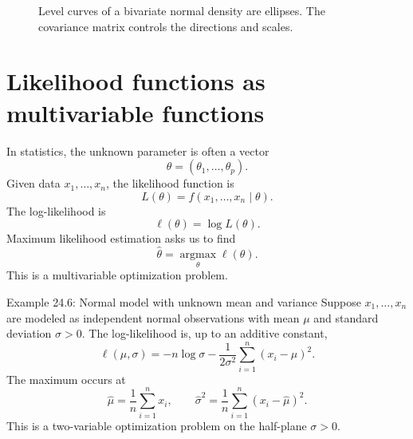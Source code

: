 \documentclass[11pt,oneside]{book}
\begin{document}
\begin{figure}[H]
\centering
{}
\caption{Level curves of a bivariate normal density are ellipses. The covariance matrix controls the directions and scales.}
\end{figure}

\section{Likelihood functions as multivariable functions}

In statistics, the unknown parameter is often a vector
\[
\theta=(\theta_1,\ldots,\theta_p).
\]
Given data $x_1,\ldots,x_n$, the likelihood function is
\[
L(\theta)=f(x_1,\ldots,x_n\mid\theta).
\]
The log-likelihood is
\[
\ell(\theta)=\log L(\theta).
\]
Maximum likelihood estimation asks us to find
\[
\hat\theta=\operatorname*{argmax}_{\theta}\ell(\theta).
\]
This is a multivariable optimization problem.

\begin{examplebox}{Example 24.6: Normal model with unknown mean and variance}
Suppose $x_1,\ldots,x_n$ are modeled as independent normal observations with mean $\mu$ and standard deviation $\sigma>0$. The log-likelihood is, up to an additive constant,
\[
\ell(\mu,\sigma)=-n\log\sigma-\frac{1}{2\sigma^2}\sum_{i=1}^n(x_i-\mu)^2.
\]
The maximum occurs at
\[
\hat\mu=\frac1n\sum_{i=1}^n x_i,
\qquad
\hat\sigma^2=\frac1n\sum_{i=1}^n(x_i-\hat\mu)^2.
\]
This is a two-variable optimization problem on the half-plane $\sigma>0$.
\end{examplebox}
\end{document}

